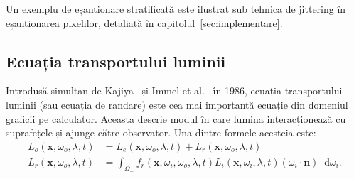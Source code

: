 \documentclass[12pt,a4paper]{report}
\newcommand*\diff{\mathop{}\!\mathrm{d}}
\numberwithin{equation}{section} %
\begin{document}
Un exemplu de eșantionare stratificată este ilustrat sub tehnica de jittering
în eșantionarea pixelilor, detaliată în capitolul~\ref{sec:implementare}.

\subsection{Ecuația transportului luminii}

Introdusă simultan de Kajiya~\cite{Kajiya} și Immel et al.~\cite{Immel} în 1986,
ecuația transportului luminii (sau ecuația de randare) este cea mai importantă ecuație din domeniul
graficii pe calculator. Aceasta descrie modul în care lumina interacționează
cu suprafețele și ajunge către observator. Una dintre formele acesteia este:
\begin{equation}
	\label{eq:light_transport}
	\begin{aligned}
		L_o(\mathbf{x}, \omega_o, \lambda, t) & = L_e(\mathbf{x}, \omega_o, \lambda, t) + L_r(\mathbf{x}, \omega_o, \lambda, t)                                                                     \\
		L_r(\mathbf{x}, \omega_o, \lambda, t) & = \int_{\Omega_+} f_r(\mathbf{x}, \omega_i, \omega_o, \lambda, t) L_i(\mathbf{x}, \omega_i, \lambda, t) (\omega_i \cdot \mathbf{n}) \diff \omega_i.
	\end{aligned}
\end{equation}
\end{document}

